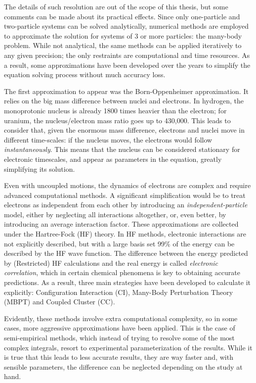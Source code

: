 The details of such resolution are out of the scope of this thesis, but some comments can be made about its practical effects. Since only one-particle and two-particle systems can be solved analytically, numerical methods are employed to approximate the solution for systems of 3 or more particles: the many-body problem. While not analytical, the same methods can be applied iteratively to any given precision; the only restraints are computational and time resources. As a result, some approximations have been developed over the years to simplify the equation solving process without much accuracy loss.

The first approximation to appear was the Born-Oppenheimer approximation. It relies on the big mass difference between nuclei and electrons. In hydrogen, the monoprotonic nucleus is already 1800 times heavier than the electron; for uranium, the nucleus/electron mass ratio goes up to 430,000. This leads to consider that, given the enormous mass difference, electrons and nuclei move in different time-scales: if the nucleus moves, the electrons would follow \textit{instantaneously}. This means that the nucleus can be considered stationary for electronic timescales, and appear as parameters in the equation, greatly simplifying its solution.

Even with uncoupled motions, the dynamics of electrons are complex and require advanced computational methods. A significant simplification would be to treat electrons as independent from each other by introducing an \textit{independent-particle} model, either by neglecting all interactions altogether, or, even better, by introducing an average interaction factor. These approximations are collected under the Hartree-Fock (HF) theory. In HF methods, electronic interactions are not explicitly described, but with a large basis set 99$\%$  of the energy can be described by the HF wave function. The difference between the energy predicted by (Restricted) HF calculations and the real energy is called \textit{electronic correlation}, which in certain chemical phenomena is key to obtaining accurate predictions. As a result, three main strategies have been developed to calculate it explicitly: Configuration Interaction (CI), Many-Body Perturbation Theory (MBPT) and Coupled Cluster (CC).

Evidently, these methods involve extra computational complexity, so in some cases, more aggressive approximations have been applied. This is the case of semi-empirical methods, which instead of trying to resolve some of the most complex integrals, resort to experimental parameterization of the results. While it is true that this leads to less accurate results, they are way faster and, with sensible parameters, the difference can be neglected depending on the study at hand.

